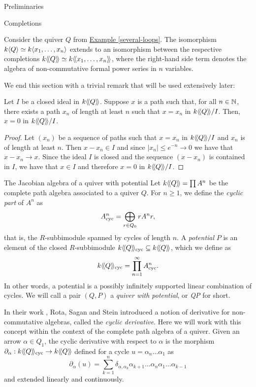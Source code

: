 \begin{chapter}{Preliminaries}
\begin{section}{Completions}
\begin{exmp}Consider the quiver $Q$ from \hyperref[several-loops]{Example \ref*{several-loops}}. The isomorphism $k\langle Q\rangle\simeq k\langle x_1,\dots,x_n\rangle$ extends to an isomorphism between the respective completions $k\langle\!\langle Q\rangle\!\rangle\simeq k\langle\!\langle x_1,\dots,x_n\rangle\!\rangle$, where the right-hand side term denotes the algebra of non-commutative formal power series in $n$ variables.
\end{exmp}

We end this section with a trivial remark that will be used extensively later:

\begin{obs}\label{arbitrarily-long} Let $I$ be a closed ideal in $k\langle\!\langle Q\rangle\!\rangle$. Suppose $x$ is a path such that, for all $n\in \mathbb{N}$, there exists a path $x_n$ of length at least $n$ such that $x=x_n$ in $k\langle\!\langle Q\rangle\!\rangle/I$. Then, $x=0$ in $k\langle\!\langle Q\rangle\!\rangle/I$.
\end{obs}
\begin{proof} Let $(x_n)$ be a sequence of paths such that $x=x_n$ in $k\langle\!\langle Q\rangle\!\rangle/I$ and $x_n$ is of length at least $n$. Then $x-x_n\in I$ and since $|x_n|\leq e^{-n}\to 0$ we have that $x-x_n\to x$. Since the ideal $I$ is closed and the sequence $(x-x_n)$ is contained in $I$, we have that $x\in I$ and therefore $x=0$ in $k\langle\!\langle Q\rangle\!\rangle/I$.
\end{proof}
\end{section}

\begin{section}{The Jacobian algebra of a quiver with potential}
Let $k\langle\!\langle Q\rangle\!\rangle=\prod A^n$ be the complete path algebra associated to a quiver $Q$. For $n\geq 1$, we define the \emph{cyclic part} of $A^n$ as
\[
A^n_{\mathrm{cyc}} = \bigoplus_{r\in Q_0} rA^nr,
\]
that is, the $R$-subbimodule spanned by cycles of length $n$. A \emph{potential} $P$ is an element of the closed $R$-subbimodule $k\langle\!\langle Q\rangle\!\rangle_{\mathrm{cyc}}\subseteq k\langle\!\langle Q\rangle\!\rangle$, which we define as
\[
k\langle\!\langle Q\rangle\!\rangle_{\mathrm{cyc}}=\prod_{n=1}^\infty A^n_{\mathrm{cyc}}.
\]
In other words, a potential is a possibly infinitely supported linear combination of cycles. We will call a pair $(Q,P)$ a \emph{quiver with potential}, or \emph{QP} for short.

In their work \cite{RSS80}, Rota, Sagan and Stein introduced a notion of derivative for non-commutative algebras, called the \emph{cyclic derivative}. Here we will work with this concept within the context of the complete path algebra of a quiver. Given an arrow $\alpha\in Q_1$, the cyclic derivative with respect to $\alpha$ is the morphism $\partial_\alpha:k\langle\!\langle Q\rangle\!\rangle_{\mathrm{cyc}}\to k\langle\!\langle Q\rangle\!\rangle$ defined for a cycle $u=\alpha_n\dots\alpha_1$ as
\[
\partial_\alpha(u) = \sum_{k=1}^n \delta_{\alpha, \alpha_k}\alpha_{k+1}\dots\alpha_n\alpha_1\dots\alpha_{k-1}
\]
and extended linearly and continuously.


\end{section}
\end{chapter}
